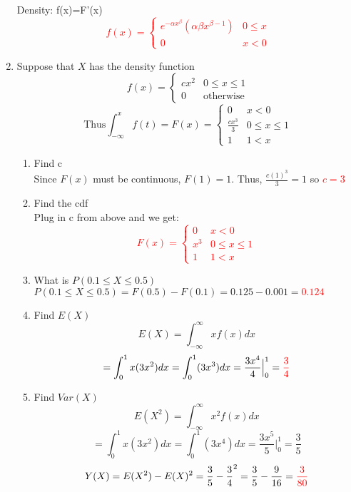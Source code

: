 \documentclass{article}
\begin{document}
\begin{enumerate}
    Density: f(x)=F'(x)
    \textcolor{red}{
    \[
    f(x)=
    \begin{cases}
        e^{- \alpha x^{\beta}}(\alpha\beta x^{\beta-1}) & 0 \leq x  \\
        0 & x < 0
    \end{cases}
    \]
    }
\pagebreak
    \item Suppose that $X$ has the density function 
    \[
    f(x)=
    \begin{cases}
        cx^2 & 0 \leq x \leq 1 \\
        0 & \text{otherwise}
    \end{cases}
    \]
    \[
    \text{Thus} \int_{-\infty}^{x} f(t) = F(x)=
    \begin{cases}
        0 & x < 0 \\
        \frac{cx^3}{3} & 0 \leq x \leq 1 \\
        1 & 1 < x
    \end{cases}
    \]
    \begin{enumerate}
        \item Find c\\
    Since $F(x)$ must be continuous, $F(1)=1$. Thus, $\frac{c(1)^3}{3}=1$ so \textcolor{red}{$c=3$}
        \item Find the cdf\\
        Plug in c from above and we get: \textcolor{red}{
        \[
        F(x)=
        \begin{cases}
            0 & x < 0 \\
            x^3 & 0 \leq x \leq 1 \\
            1 & 1 < x
        \end{cases}
        \]}
        \item What is $P(0.1 \leq X \leq 0.5)$\\
        $P(0.1 \leq X \leq 0.5)=F(0.5)-F(0.1)=0.125-0.001=$\textcolor{red}{$0.124$}
        \item Find $E(X)$
        \[
        E(X)=\int_{-\infty}^{\infty}xf(x)dx
        \]
        \[
        =\int_{0}^{1}x(3x^2)dx=\int_{0}^{1}(3x^3)dx=\frac{3x^4}{4}\Big|_0^1=\textcolor{red}{\frac{3}{4}}
        \]
        \item Find $Var(X)$
        \[
        E(X^2)=\int_{-\infty}^{\infty}x^2f(x)dx
        \]
        \[
        =\int_{0}^{1}x(3x^2)dx=\int_{0}^{1}(3x^4)dx=\frac{3x^5}{5}\Big|_0^1=\frac{3}{5}
        \]
        \[
        Y(X)=E(X^2)-E(X)^2=\frac{3}{5}-\frac{3}{4}^2=\frac{3}{5}-\frac{9}{16}=\textcolor{red}{\frac{3}{80}}
        \]

\end{enumerate}
\end{enumerate}
\end{document}
